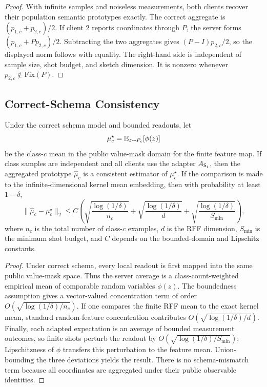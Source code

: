 \begin{proof}
With infinite samples and noiseless measurements, both clients recover their population semantic prototypes exactly. The correct aggregate is \((p_{1,c}+p_{2,c})/2\). If client 2 reports coordinates through \(P\), the server forms \((p_{1,c}+Pp_{2,c})/2\). Subtracting the two aggregates gives \((P-I)p_{2,c}/2\), so the displayed norm follows with equality. The right-hand side is independent of sample size, shot budget, and sketch dimension. It is nonzero whenever \(p_{2,c}\notin\mathrm{Fix}(P)\).
\end{proof}

\subsection{Correct-Schema Consistency}

\begin{theorem}
Under the correct schema model and bounded readouts, let
\begin{equation}
    \mu_c^\star=\mathbb{E}_{z\sim P_c}[\phi(z)]
\end{equation}
be the class-\(c\) mean in the public value-mask domain for the finite feature map. If class samples are independent and all clients use the adapter \(A_{\mathsf{S}_i}\), then the aggregated prototype \(\hat{\mu}_c\) is a consistent estimator of \(\mu_c^\star\). If the comparison is made to the infinite-dimensional kernel mean embedding, then with probability at least \(1-\delta\),
\begin{equation}
    \|\hat{\mu}_c-\mu_c^\star\|_2
    \le
    C\!\left(
    \sqrt{\frac{\log(1/\delta)}{n_c}}
    +
    \sqrt{\frac{\log(1/\delta)}{d}}
    +
    \sqrt{\frac{\log(1/\delta)}{S_{\min}}}
    \right),
\end{equation}
where \(n_c\) is the total number of class-\(c\) examples, \(d\) is the RFF dimension, \(S_{\min}\) is the minimum shot budget, and \(C\) depends on the bounded-domain and Lipschitz constants.
\end{theorem}

\begin{proof}
Under correct schema, every local readout is first mapped into the same public value-mask space. Thus the server average is a class-count-weighted empirical mean of comparable random variables \(\phi(z)\). The boundedness assumption gives a vector-valued concentration term of order \(O(\sqrt{\log(1/\delta)/n_c})\). If one compares the finite RFF mean to the exact kernel mean, standard random-feature concentration contributes \(O(\sqrt{\log(1/\delta)/d})\). Finally, each adapted expectation is an average of bounded measurement outcomes, so finite shots perturb the readout by \(O(\sqrt{\log(1/\delta)/S_{\min}})\); Lipschitzness of \(\phi\) transfers this perturbation to the feature mean. Union-bounding the three deviations yields the result. There is no schema-mismatch term because all coordinates are aggregated under their public observable identities.
\end{proof}

